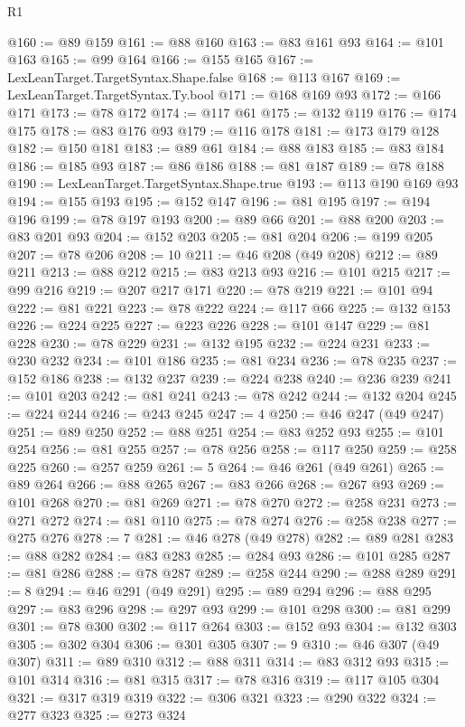 \begin{lexlean}{R1}
\begin{coremodule}
@160 := @89 @159
@161 := @88 @160
@163 := @83 @161 @93
@164 := @101 @163
@165 := @99 @164
@166 := @155 @165
@167 := LexLeanTarget.TargetSyntax.Shape.false
@168 := @113 @167
@169 := LexLeanTarget.TargetSyntax.Ty.bool
@171 := @168 @169 @93
@172 := @166 @171
@173 := @78 @172
@174 := @117 @61
@175 := @132 @119
@176 := @174 @175
@178 := @83 @176 @93
@179 := @116 @178
@181 := @173 @179 @128
@182 := @150 @181
@183 := @89 @61
@184 := @88 @183
@185 := @83 @184
@186 := @185 @93
@187 := @86 @186
@188 := @81 @187
@189 := @78 @188
@190 := LexLeanTarget.TargetSyntax.Shape.true
@193 := @113 @190 @169 @93
@194 := @155 @193
@195 := @152 @147
@196 := @81 @195
@197 := @194 @196
@199 := @78 @197 @193
@200 := @89 @66
@201 := @88 @200
@203 := @83 @201 @93
@204 := @152 @203
@205 := @81 @204
@206 := @199 @205
@207 := @78 @206
@208 := 10
@211 := @46 @208 (@49 @208)
@212 := @89 @211
@213 := @88 @212
@215 := @83 @213 @93
@216 := @101 @215
@217 := @99 @216
@219 := @207 @217 @171
@220 := @78 @219
@221 := @101 @94
@222 := @81 @221
@223 := @78 @222
@224 := @117 @66
@225 := @132 @153
@226 := @224 @225
@227 := @223 @226
@228 := @101 @147
@229 := @81 @228
@230 := @78 @229
@231 := @132 @195
@232 := @224 @231
@233 := @230 @232
@234 := @101 @186
@235 := @81 @234
@236 := @78 @235
@237 := @152 @186
@238 := @132 @237
@239 := @224 @238
@240 := @236 @239
@241 := @101 @203
@242 := @81 @241
@243 := @78 @242
@244 := @132 @204
@245 := @224 @244
@246 := @243 @245
@247 := 4
@250 := @46 @247 (@49 @247)
@251 := @89 @250
@252 := @88 @251
@254 := @83 @252 @93
@255 := @101 @254
@256 := @81 @255
@257 := @78 @256
@258 := @117 @250
@259 := @258 @225
@260 := @257 @259
@261 := 5
@264 := @46 @261 (@49 @261)
@265 := @89 @264
@266 := @88 @265
@267 := @83 @266
@268 := @267 @93
@269 := @101 @268
@270 := @81 @269
@271 := @78 @270
@272 := @258 @231
@273 := @271 @272
@274 := @81 @110
@275 := @78 @274
@276 := @258 @238
@277 := @275 @276
@278 := 7
@281 := @46 @278 (@49 @278)
@282 := @89 @281
@283 := @88 @282
@284 := @83 @283
@285 := @284 @93
@286 := @101 @285
@287 := @81 @286
@288 := @78 @287
@289 := @258 @244
@290 := @288 @289
@291 := 8
@294 := @46 @291 (@49 @291)
@295 := @89 @294
@296 := @88 @295
@297 := @83 @296
@298 := @297 @93
@299 := @101 @298
@300 := @81 @299
@301 := @78 @300
@302 := @117 @264
@303 := @152 @93
@304 := @132 @303
@305 := @302 @304
@306 := @301 @305
@307 := 9
@310 := @46 @307 (@49 @307)
@311 := @89 @310
@312 := @88 @311
@314 := @83 @312 @93
@315 := @101 @314
@316 := @81 @315
@317 := @78 @316
@319 := @117 @105 @304
@321 := @317 @319 @319
@322 := @306 @321
@323 := @290 @322
@324 := @277 @323
@325 := @273 @324

\end{coremodule}
\end{lexlean}
